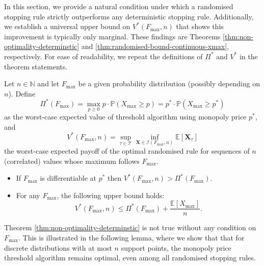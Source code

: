\documentclass[11pt,a4paper]{article}
\newcounter{theorempart}[theorem]
\numberwithin{equation}{section}
\newcommand{\N}{\mathbb{N}}
\begin{document}
In this section, we provide a natural condition under which a randomised stopping rule strictly outperforms any deterministic stopping rule. Additionally, we establish a universal upper bound on $V^*(F_{\max},n)$ that shows this improvement is typically only marginal. These findings are Theorems \ref{thm:non-optimality-determinstic} and \ref{thm:randomised-bound-continuous-xmax}, respectively. For ease of readability, we repeat the definitions of $\Pi^*$ and $V^*$ in the theorem statements.




\begin{theorem}
    Let $n \in \N$ and let $F_{\max}$ be a given probability distribution (possibly depending on $n$). Define
    $$
    \Pi^*(F_{\max}) = \max_{ p \geq 0} p \cdot\mathbb{P}(X_{\max}\ge p) = p^* \cdot\mathbb{P}(X_{\max}\ge p^*)
    $$
    as the worst-case expected value of threshold algorithm using monopoly price $p^*$, and 
    $$
    V^*(F_{\max}, n) = \sup_{\tau\in\mathcal{T}}\inf_{\boldsymbol{X}\in\mathcal{I}(F_{\max}, n)}\mathbb{E}[\boldsymbol{X}_{\tau}]
    $$
    the worst-case expected payoff of the optimal randomised rule for sequences of $n$ (correlated) values whose maximum follows $F_{\max}$.
    \begin{itemize}
        \item [(a)] \label{thm:non-optimality-determinstic}
        If $F_{\max}$ is differentiable at $p^*$ then
        $V^*(F_{\max}, n) > \Pi^*(F_{\max})$.
        \item [(b)] \label{thm:randomised-bound-continuous-xmax} For any $F_{\max}$, the following upper bound holds: 
        $$
        V^*(F_{\max}, n) \le \Pi^*(F_{\max}) + \frac{\mathbb{E}[X_{\max}]}{n}.
        $$
    \end{itemize}    
    \label{thm:first_bounds}
\end{theorem}


Theorem \ref{thm:non-optimality-determinstic} is not true without any condition on $F_{\max}$. This is illustrated in the following lemma, where we show that that for discrete distributions with at most $n$ support points, the monopoly price threshold algorithm remains optimal, even among all randomised stopping rules.
\end{document}
